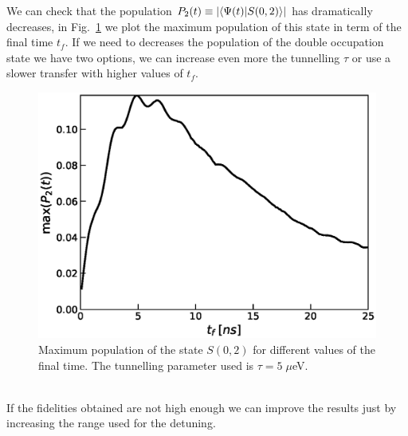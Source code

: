 \documentclass[a4paper,11pt]{article}
\begin{document}
We can check that the population $P_2(t)\equiv \abs{\braket{\Psi(t)}{S(0,2)}}$ has dramatically decreases, in Fig.~\ref{fig:max_pop_S22} we plot the maximum population of this state in term of the final time $t_f$. If we need to decreases the population of the double occupation state we have two options, we can increase even more the tunnelling $\tau$ or use a slower transfer with higher values of $t_f$.
\begin{figure}[!htbp]
	\centering
	\includegraphics[width=0.7\linewidth]{max_pop_S22.eps}
	\caption{Maximum population of the state $S(0,2)$ for different values of the final time. The tunnelling parameter used is $\tau=5\; \mu$eV.}
	\label{fig:max_pop_S22}
\end{figure}\\

If the fidelities obtained are not high enough we can improve the results just by increasing the range used for the detuning.

\appendix
\end{document}
